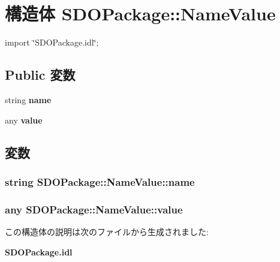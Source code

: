 \section{構造体 SDOPackage::NameValue}
\label{structSDOPackage_1_1NameValue}


{\ttfamily import \char`\"{}SDOPackage.idl\char`\"{};}

\subsection*{Public 変数}
\begin{DoxyCompactItemize}
\item 
string {\bf name}
\item 
any {\bf value}
\end{DoxyCompactItemize}


\subsection{変数}
\subsubsection[{name}]{\setlength{\rightskip}{0pt plus 5cm}string {\bf SDOPackage::NameValue::name}}\label{structSDOPackage_1_1NameValue_a4604ff503adb6aea4fc6908be13476ad}
\subsubsection[{value}]{\setlength{\rightskip}{0pt plus 5cm}any {\bf SDOPackage::NameValue::value}}\label{structSDOPackage_1_1NameValue_a0796af9c2444254bc9b5e9f63c182f00}


この構造体の説明は次のファイルから生成されました:\begin{DoxyCompactItemize}
\item 
{\bf SDOPackage.idl}\end{DoxyCompactItemize}
